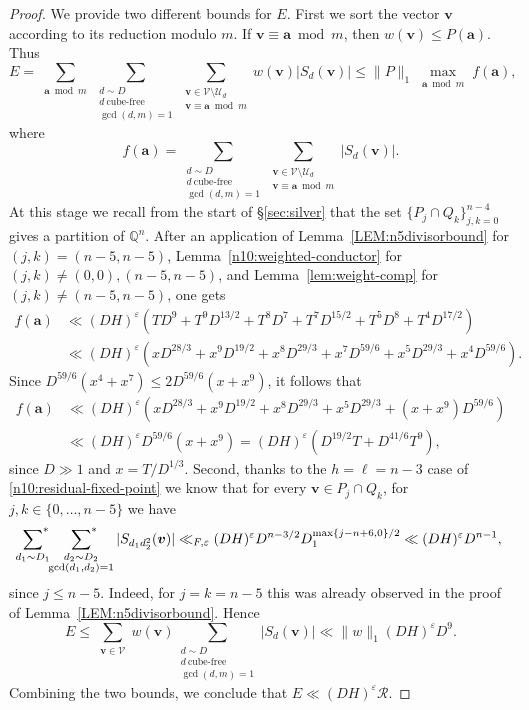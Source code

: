 \documentclass[a4paper,11pt, twoside,reqno]{amsart}
\theoremstyle{plain}
\theoremstyle{definition}
\theoremstyle{remark}
\newcommand{\bfa}{\bm{a}}
\newcommand{\bfv}{\bm{v}}
\newcommand{\QQ}{\mathbb{Q}}
\newcommand{\ve}{\varepsilon}
\renewcommand{\le}{\leqslant}
\renewcommand{\leq}{\leqslant}
\numberwithin{equation}{section}
\begin{document}
\begin{proof}
We provide two different bounds for $E$.
First we sort the vector $\bfv$ according to its reduction modulo $m$.
If $\bfv\equiv \bfa\bmod{m}$, then $w(\bfv) \le P(\bfa)$.
Thus
\begin{equation*}
E=\sum_{\substack{\bfa\bmod{m}}}\sum_{\substack{
d\sim D\\
d\ \text{cube-free}\\
\gcd(d,m)=1}}
\sum_{\substack{
\bfv\in \mathcal V \setminus \mathcal U_d\\
\bfv\equiv\bfa\bmod{m}}} w(\bfv)|S_d(\bfv)|
\le \|P\|_{1}\max_{\substack{\bfa\bmod{m}}} f(\bfa),
\end{equation*}
where
\[
f(\bfa) = \sum_{\substack{
d\sim D\\
d\ \text{cube-free}\\
\gcd(d,m)=1}}
\sum_{\substack{
\bfv\in \mathcal V \setminus \mathcal U_d\\
\bfv\equiv\bfa\bmod{m}}} |S_{d}(\bfv)|.
\]
At this stage we recall from the 
start of \S\ref{sec:silver} that 
the set $\{P_j\cap Q_k\}_{j,k=0}^{n-4}$
gives a partition of $\QQ^n$.
After an application of
Lemma~\ref{LEM:n5divisorbound} for $(j,k)=(n-5,n-5)$,
Lemma~\ref{n10:weighted-conductor} for $(j,k)\ne (0,0),(n-5,n-5)$,
and Lemma~\ref{lem:weight-comp} for $(j,k)\ne (n-5,n-5)$,
one gets
\[
\begin{split}
f(\bfa) &\ll (DH)^\ve
\left(
TD^9+T^9D^{13/2}+T^8D^7
+T^7D^{15/2}+T^5D^8+T^4D^{17/2}
\right)\\&\ll(DH)^\ve\left(xD^{28/3}+x^{9}D^{19/2}+x^{8}D^{29/3}+x^{7}D^{59/6}+x^{5}D^{29/3}+x^{4}D^{59/6}\right).
\end{split}
\]
Since $D^{59/6}(x^{4}+x^{7})\leq 2D^{59/6}(x+x^{9})$,
it follows that
\[
\begin{split}
f(\bfa) &\ll  (DH)^\ve\left(xD^{28/3}+x^{9}D^{19/2}+x^{8}D^{29/3}+x^{5}D^{29/3}+(x+x^{9})D^{59/6}\right)\\&\ll (DH)^\ve D^{59/6}(x+x^{9})
= (DH)^\ve (D^{19/2}T+D^{41/6}T^9),
\end{split}
\]
since $D\gg 1$
and $ x=T/D^{1/3}$.
Second,
thanks to the $h=\ell=n-3$ case of \eqref{n10:residual-fixed-point}
we know that for every $\bfv\in P_{j}\cap Q_{k}$, for $j,k\in\{0,\dots,n-5\}$ we have 
\[
\sideset{}{^*}\sum_{d_1\sim D_1}
\sideset{}{^*}\sum_{\substack{
d_2\sim D_2\\\gcd(d_1,d_2)=1}}
|S_{d_1d_2^2}(\bfv)|\ll_{F,\ve} (DH)^\ve
D^{n-3/2} D_1^{\max\{j-n+6,0\}/2}
\ll (DH)^\ve D^{n-1},
\]
since $j\le n-5$.
Indeed, for $j=k=n-5$
this was already observed in the proof of Lemma~\ref{LEM:n5divisorbound}.
Hence
\[
E\le \sum_{\substack{
\bfv\in\mathcal V}} w(\bfv)\sum_{\substack{
d\sim D\\
d\ \text{cube-free}\\
\gcd(d,m)=1}}
|S_{d}(\bfv)|
\ll \|w\|_{1} (DH)^\ve D^9.
\]
Combining the two bounds, we conclude that $E\ll (DH)^\ve \mathcal R$.


\end{proof}
\end{document}
